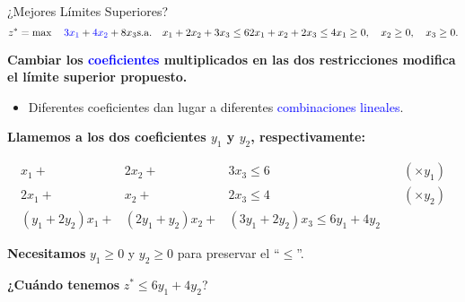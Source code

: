 \documentclass{beamer}
\begin{document}
\begin{frame}{¿Mejores Límites Superiores?}
    \[
    z^* = \max \quad \textcolor{blue}{3x_1} + \textcolor{blue}{4x_2} + 8x_3 \\
    \text{s.a.} \quad x_1 + 2x_2 + 3x_3 \leq 6 \\
    2x_1 + x_2 + 2x_3 \leq 4 \\
    x_1 \geq 0, \quad x_2 \geq 0, \quad x_3 \geq 0.
    \]

    \vspace{0.3cm}
    \textbf{Cambiar los \textcolor{blue}{coeficientes} multiplicados en las dos restricciones modifica el límite superior propuesto.}
    \begin{itemize}
        \item Diferentes coeficientes dan lugar a diferentes \textcolor{blue}{combinaciones lineales}.
    \end{itemize}

    \vspace{0.3cm}
    \textbf{Llamemos a los dos coeficientes \( y_1 \) y \( y_2 \), respectivamente:}
    
    \[
    \begin{array}{cccc}
    x_1 + & 2x_2 + & 3x_3 \leq 6 & \quad (\times y_1) \\
    2x_1 + & x_2 + & 2x_3 \leq 4 & \quad (\times y_2) \\
    \hline
    (y_1 + 2y_2)x_1 + & (2y_1 + y_2)x_2 + & (3y_1 + 2y_2)x_3 \leq 6y_1 + 4y_2
    \end{array}
    \]

    \vspace{0.3cm}
    \textbf{Necesitamos} \( y_1 \geq 0 \) y \( y_2 \geq 0 \) para preservar el “\(\leq\)”.

    \vspace{0.3cm}
    \textbf{¿Cuándo tenemos} \( z^* \leq 6y_1 + 4y_2 \)?
\end{frame}
\end{document}
